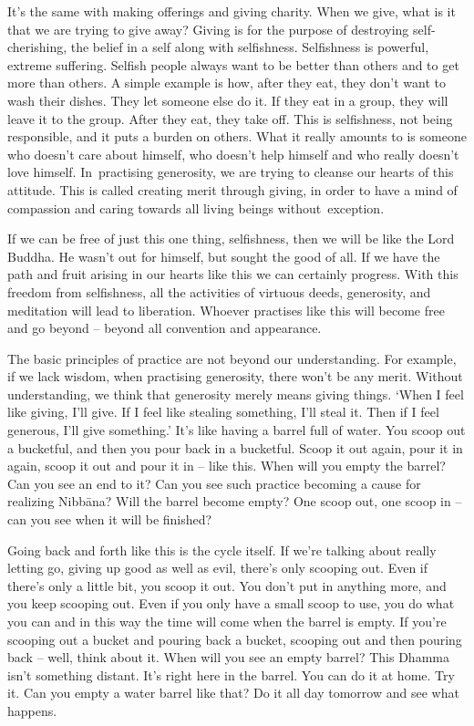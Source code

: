 It's the same with making offerings and giving charity. When we give, what is it that we are trying to give away? Giving is for the purpose of destroying self-cherishing, the belief in a self along with selfishness. Selfishness is powerful, extreme suffering. Selfish people always want to be better than others and to get more than others. A simple example is how, after they eat, they don't want to wash their dishes. They let someone else do it. If they eat in a group, they will leave it to the group. After they eat, they take off. This is selfishness, not being responsible, and it puts a burden on others. What it really amounts to is someone who doesn't care about himself, who doesn't help himself and who really doesn't love himself. \mbox{In practising} generosity, we are trying to cleanse our hearts of this attitude. This is called creating merit through giving, in order to have a mind of compassion and caring towards all living beings \mbox{without exception.}

If we can be free of just this one thing, selfishness, then we will be like the Lord Buddha. He wasn't out for himself, but sought the good of all. If we have the path and fruit arising in our hearts like this we can certainly progress. With this freedom from selfishness, all the activities of virtuous deeds, generosity, and meditation will lead to liberation. Whoever practises like this will become free and go beyond -- beyond all convention and appearance.

The basic principles of practice are not beyond our understanding. For example, if we lack wisdom, when practising generosity, there won't be any merit. Without understanding, we think that generosity merely means giving things. `When I feel like giving, I'll give. If I feel like stealing something, I'll steal it. Then if I feel generous, I'll give something.' It's like having a barrel full of water. You scoop out a bucketful, and then you pour back in a bucketful. Scoop it out again, pour it in again, scoop it out and pour it in -- like this. When will you empty the barrel? Can you see an end to it? Can you see such practice becoming a cause for realizing Nibb\=ana? Will the barrel become empty? One scoop out, one scoop in -- can you see when it will be finished?

Going back and forth like this is  the cycle itself. If we're talking about really letting go, giving up good as well as evil, there's only scooping out. Even if there's only a little bit, you scoop it out. You don't put in anything more, and you keep scooping out. Even if you only have a small scoop to use, you do what you can and in this way the time will come when the barrel is empty. If you're scooping out a bucket and pouring back a bucket, scooping out and then pouring back -- well, think about it. When will you see an empty barrel? This Dhamma isn't something distant. It's right here in the barrel. You can do it at home. Try it. Can you empty a water barrel like that? Do it all day tomorrow and see what happens.


